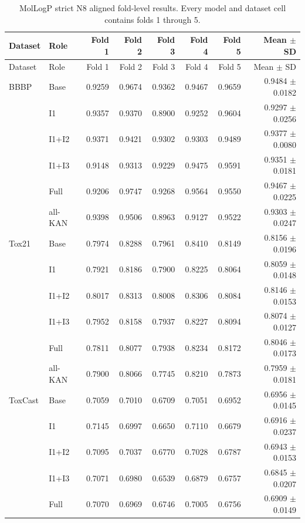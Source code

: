 \begin{landscape}
\begin{longtable}{llrrrrrr}
\caption{MolLogP strict N8 aligned fold-level results. Every model and dataset cell contains folds 1 through 5.}
\label{tab:si-logp-fold-results}\\
\toprule
Dataset & Role & Fold 1 & Fold 2 & Fold 3 & Fold 4 & Fold 5 & Mean $\pm$ SD \\
\midrule
\endfirsthead
\toprule
Dataset & Role & Fold 1 & Fold 2 & Fold 3 & Fold 4 & Fold 5 & Mean $\pm$ SD \\
\midrule
\endhead
BBBP & Base & 0.9259 & 0.9674 & 0.9362 & 0.9467 & 0.9659 & 0.9484 $\pm$ 0.0182 \\
 & I1 & 0.9357 & 0.9370 & 0.8900 & 0.9252 & 0.9604 & 0.9297 $\pm$ 0.0256 \\
 & I1+I2 & 0.9371 & 0.9421 & 0.9302 & 0.9303 & 0.9489 & 0.9377 $\pm$ 0.0080 \\
 & I1+I3 & 0.9148 & 0.9313 & 0.9229 & 0.9475 & 0.9591 & 0.9351 $\pm$ 0.0181 \\
 & Full & 0.9206 & 0.9747 & 0.9268 & 0.9564 & 0.9550 & 0.9467 $\pm$ 0.0225 \\
 & all-KAN & 0.9398 & 0.9506 & 0.8963 & 0.9127 & 0.9522 & 0.9303 $\pm$ 0.0247 \\
\midrule
Tox21 & Base & 0.7974 & 0.8288 & 0.7961 & 0.8410 & 0.8149 & 0.8156 $\pm$ 0.0196 \\
 & I1 & 0.7921 & 0.8186 & 0.7900 & 0.8225 & 0.8064 & 0.8059 $\pm$ 0.0148 \\
 & I1+I2 & 0.8017 & 0.8313 & 0.8008 & 0.8306 & 0.8084 & 0.8146 $\pm$ 0.0153 \\
 & I1+I3 & 0.7952 & 0.8158 & 0.7937 & 0.8227 & 0.8094 & 0.8074 $\pm$ 0.0127 \\
 & Full & 0.7811 & 0.8077 & 0.7938 & 0.8234 & 0.8172 & 0.8046 $\pm$ 0.0173 \\
 & all-KAN & 0.7900 & 0.8066 & 0.7745 & 0.8210 & 0.7873 & 0.7959 $\pm$ 0.0181 \\
\midrule
ToxCast & Base & 0.7059 & 0.7010 & 0.6709 & 0.7051 & 0.6952 & 0.6956 $\pm$ 0.0145 \\
 & I1 & 0.7145 & 0.6997 & 0.6650 & 0.7110 & 0.6679 & 0.6916 $\pm$ 0.0237 \\
 & I1+I2 & 0.7095 & 0.7037 & 0.6770 & 0.7028 & 0.6787 & 0.6943 $\pm$ 0.0153 \\
 & I1+I3 & 0.7071 & 0.6980 & 0.6539 & 0.6879 & 0.6757 & 0.6845 $\pm$ 0.0207 \\
 & Full & 0.7070 & 0.6969 & 0.6746 & 0.7005 & 0.6756 & 0.6909 $\pm$ 0.0149 \\

\end{longtable}
\end{landscape}
